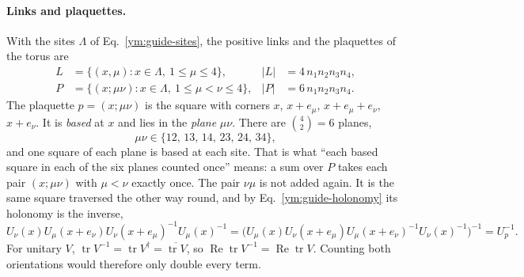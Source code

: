 \paragraph{Links and plaquettes.}
With the sites $\Lambda$ of Eq.~\eqref{ym:guide-sites}, the positive links
and the plaquettes of the torus are
\begin{align}
 L&=\{(x,\mu):x\in\Lambda,\ 1\le\mu\le4\},
 &|L|&=4\,n_1n_2n_3n_4,\label{ym:guide-links}\\
 P&=\{(x;\mu\nu):x\in\Lambda,\ 1\le\mu<\nu\le4\},
 &|P|&=6\,n_1n_2n_3n_4.\label{ym:guide-plaquettes}
\end{align}
The plaquette $p=(x;\mu\nu)$ is the square with corners $x$, $x+e_\mu$,
$x+e_\mu+e_\nu$, $x+e_\nu$. It is \emph{based} at $x$ and lies in the
\emph{plane} $\mu\nu$. There are $\binom42=6$ planes,
\begin{equation}\label{ym:guide-six-planes}
 \mu\nu\in\{12,\,13,\,14,\,23,\,24,\,34\},
\end{equation}
and one square of each plane is based at each site. That is what ``each
based square in each of the six planes counted once'' means: a sum over $P$
takes each pair $(x;\mu\nu)$ with $\mu<\nu$ exactly once. The pair $\nu\mu$
is not added again. It is the same square traversed the other way round,
and by Eq.~\eqref{ym:guide-holonomy} its holonomy is the inverse,
\begin{equation}\label{ym:guide-reversed-plaquette}
 U_\nu(x)U_\mu(x+e_\nu)U_\nu(x+e_\mu)^{-1}U_\mu(x)^{-1}
 =\big(U_\mu(x)U_\nu(x+e_\mu)U_\mu(x+e_\nu)^{-1}U_\nu(x)^{-1}\big)^{-1}
 =U_p^{-1}.
\end{equation}
For unitary $V$, $\operatorname{tr}V^{-1}=\operatorname{tr}V^\dagger
=\overline{\operatorname{tr}V}$, so $\operatorname{Re}\operatorname{tr}V^{-1}
=\operatorname{Re}\operatorname{tr}V$. Counting both orientations would
therefore only double every term.


